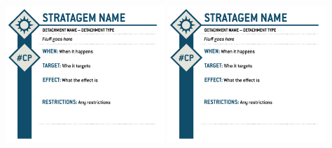 \documentclass{report}
\begin{document}
\begin{multicols}{2}
\begin{minipage}[t][23.5cm][b]{\textwidth}
\includegraphics[width =0.45\textwidth]{Images/Stratagems/Stratagem_5.png}
\includegraphics[width =0.45\textwidth]{Images/Stratagems/Stratagem_6.png}
\end{minipage}
\end{multicols}
\end{document}
